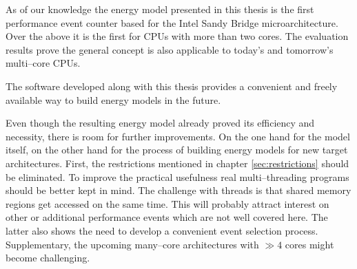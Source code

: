 
As of our knowledge the energy model presented in this thesis is the first
performance event counter based for the Intel\TReg{} Sandy Bridge
microarchitecture. Over the above it is the first for CPUs with more than two
cores. The evaluation results prove the general concept is also applicable to
today's and tomorrow's multi--core CPUs.

The software developed along with this thesis provides a convenient and freely
available way to build energy models in the future.


\label{sec:problems}

Even though the resulting energy model already proved its efficiency and
necessity, there is room for further improvements. On the one hand for the model
itself, on the other hand for the process of building energy models for new
target architectures. First, the restrictions mentioned in chapter
\ref{sec:restrictions} should be eliminated. To improve the practical usefulness
real multi--threading programs should be better kept in mind. The challenge with
threads is that shared memory regions get accessed on the same time. This will
probably attract interest on other or additional performance events which are
not well covered here. The latter also shows the need to develop a convenient
event selection process. Supplementary, the upcoming many--core architectures
with $\gg 4$ cores might become challenging.

